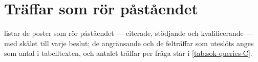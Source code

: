 \section{Träffar som rör påståendet}
\label{sec:stegvis-traffar}

 listar de poster som rör påståendet ---
citerade, stödjande och kvalificerande --- med skälet till varje beslut;
de angränsande och de felträffar som uteslöts anges som antal i
tabelltexten, och antalet träffar per fråga står i
\cref{tab:sok-queries-C}.
